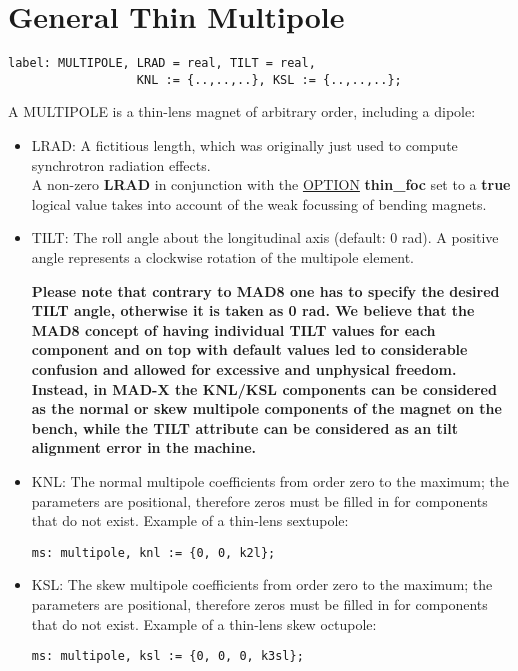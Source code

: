 
\section{General Thin Multipole}

\begin{verbatim}
label: MULTIPOLE, LRAD = real, TILT = real,
                  KNL := {..,..,..}, KSL := {..,..,..};
\end{verbatim} 

A MULTIPOLE is a thin-lens magnet of arbitrary order, including a dipole: 
\begin{itemize}
    \item LRAD: A fictitious length, which was originally just used to
      compute synchrotron radiation effects. \\
      A non-zero \textbf{ LRAD } in conjunction  with the
      \href{../control/general.html#option}{OPTION}\textbf{ thin\_foc }
      set to a \textbf{ true } logical value takes into account of the
      weak focussing of bending magnets.  
    \item TILT: The roll angle about the longitudinal axis (default: 0
      rad). A positive angle represents a clockwise rotation of the
      multipole element.   

      \textbf{  Please note that contrary to MAD8 one has to specify the
        desired TILT angle, otherwise it is taken as 0 rad. We believe
        that the MAD8 concept of having individual TILT values for each
        component and on top with default values led to considerable
        confusion and allowed for excessive and unphysical
        freedom. Instead, in MAD-X the KNL/KSL components can be
        considered as the normal or skew multipole components of the
        magnet on the bench, while the TILT attribute can be considered
        as an tilt alignment error in the machine. } 

    \item KNL: The normal multipole coefficients from order zero to the
      maximum; the parameters are positional, therefore zeros must be
      filled in for components that do not exist. Example of a thin-lens
      sextupole:  
\begin{verbatim}
ms: multipole, knl := {0, 0, k2l};
\end{verbatim}

   \item KSL: The skew multipole coefficients from order zero to the
     maximum; the parameters are positional, therefore zeros must be
     filled in for components that do not exist. Example of a thin-lens
     skew octupole:  
\begin{verbatim}
ms: multipole, ksl := {0, 0, 0, k3sl};
\end{verbatim}

\end{itemize} 

